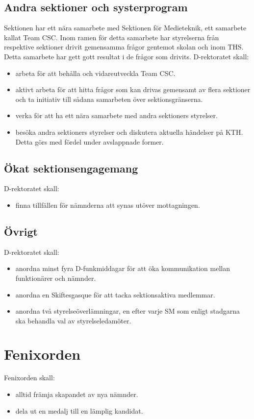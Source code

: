 \documentclass{dgovdoc}
\begin{document}
\subsection {Andra sektioner och systerprogram}
Sektionen har ett nära samarbete med Sektionen för Medieteknik, ett samarbete kallat Team CSC. Inom ramen för detta samarbete har styrelserna från respektive sektioner drivit gemensamma frågor gentemot skolan och inom THS. Detta samarbete har gett gott resultat i de frågor som drivits.
\vspace{0.4cm}
\newline
D-rektoratet skall:
\begin{itemize}
\item arbeta för att behålla och vidareutveckla Team CSC.
\item aktivt arbeta för att hitta frågor som kan drivas gemensamt av flera sektioner och ta initiativ till sådana samarbeten över sektionsgränserna.
\item verka för att ha ett nära samarbete med andra sektioners styrelser.
\item besöka andra sektioners styrelser och diskutera aktuella händelser på KTH. Detta görs med fördel under avslappnade former.
\end{itemize}

\subsection{Ökat sektionsengagemang}
D-rektoratet skall:
\begin{itemize}
\item finna tillfällen för nämnderna att synas utöver mottagningen.
\end{itemize}

\subsection{Övrigt}
D-rektoratet skall:
\begin{itemize}
\item anordna minst fyra D-funkmiddagar för att öka kommunikation mellan funktionärer och nämnder.
\item anordna en Skiftesgasque för att tacka sektionsaktiva medlemmar.
\item anordna två styrelseöverlämningar, en efter varje SM som enligt stadgarna ska behandla val av styrelseledamöter.
\end{itemize}

\section{Fenixorden} 
Fenixorden skall:
\begin{itemize} 
\item alltid främja skapandet av nya nämnder. 
\item dela ut en medalj till en lämplig kandidat.
\end{itemize}
\end{document}
